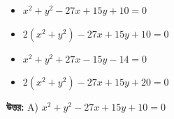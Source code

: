 \documentclass[12pt, a4paper]{article}
\begin{document}
\vspace{1em}
\begin{itemize}[label={}, leftmargin=1cm, itemsep=0.5em]
    \item[\textbf{A)}] $x^2 + y^2 - 27x + 15y + 10 = 0$
    \item[\textbf{B)}] $2(x^2 + y^2) - 27x + 15y + 10 = 0$
    \item[\textbf{C)}] $x^2 + y^2 + 27x - 15y - 14 = 0$
    \item[\textbf{D)}] $2(x^2 + y^2) - 27x + 15y + 20 = 0$
\end{itemize}

\vspace{0.5em}
\begin{tcolorbox}[answerbox]
    \textbf{\color{success} উত্তর:} A) $x^2 + y^2 - 27x + 15y + 10 = 0$
\end{tcolorbox}
\vspace{1em}
\end{document}
